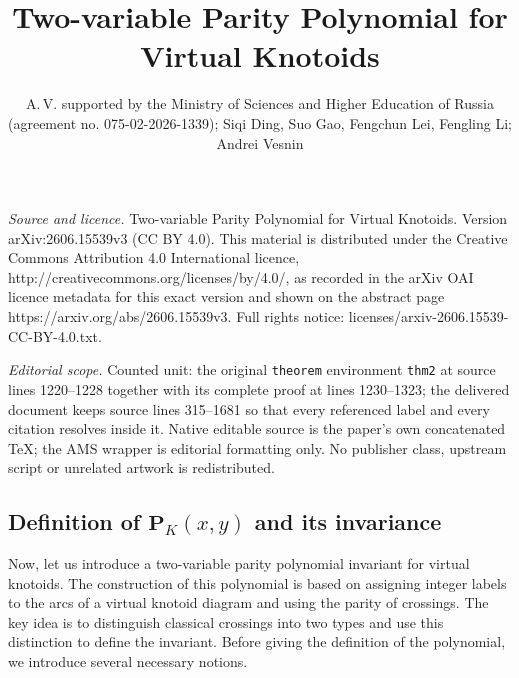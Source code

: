\documentclass[10pt,a4paper]{amsart}
\numberwithin{equation}{section}
\numberwithin{equation}{section}
\begin{document}
\title[Two-variable Parity Polynomial for Virtual Knotoids]{Two-variable Parity Polynomial for Virtual Knotoids}
\author{A.\,V. supported by the Ministry of Sciences and Higher Education of Russia (agreement no. 075-02-2026-1339); Siqi Ding, Suo Gao, Fengchun Lei, Fengling Li; Andrei Vesnin}
\date{}
\maketitle
\noindent\emph{Source and licence.} Two-variable Parity Polynomial for Virtual Knotoids. Version arXiv:2606.15539v3 (CC BY 4.0). This material is distributed under the Creative Commons Attribution 4.0 International licence, http://creativecommons.org/licenses/by/4.0/, as recorded in the arXiv OAI licence metadata for this exact version and shown on the abstract page https://arxiv.org/abs/2606.15539v3. Full rights notice: licenses/arxiv-2606.15539-CC-BY-4.0.txt.\par\smallskip
\noindent\textit{Editorial scope.} Counted unit: the original \texttt{theorem} environment \texttt{thm2} at source lines 1220--1228 together with its complete proof at lines 1230--1323; the delivered document keeps source lines 315--1681 so that every referenced label and every citation resolves inside it. Native editable source is the paper's own concatenated TeX; the AMS wrapper is editorial formatting only. No publisher class, upstream script or unrelated artwork is redistributed.
\subsection{Definition of $\mathbf{P}_K(x,y)$ and its invariance} \label{subsection2.2}

Now, let us introduce a two-variable parity polynomial invariant for virtual knotoids. The construction of this polynomial is based on assigning integer labels to the arcs of a virtual knotoid diagram and using the parity of crossings. The key idea is to distinguish classical crossings into two types and use this distinction to define the invariant. Before giving the definition of the polynomial, we introduce several necessary notions.
\end{document}
